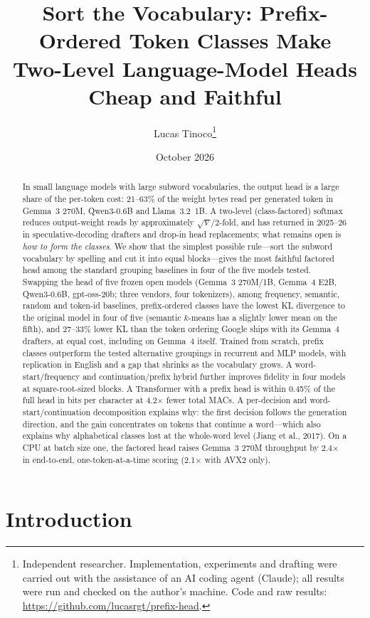 \documentclass[11pt]{article}
\title{Sort the Vocabulary: Prefix-Ordered Token Classes Make\\Two-Level Language-Model Heads Cheap and Faithful}
\author{Lucas Tinoco\thanks{Independent researcher. Implementation, experiments and drafting were carried out with the assistance of an AI coding agent (Claude); all results were run and checked on the author's machine. Code and raw results: \url{https://github.com/lucasrgt/prefix-head}.}}
\date{October 2026}
\begin{document}
\maketitle

\begin{abstract}
In small language models with large subword vocabularies, the output head is a large share of the per-token cost: 21--63\% of the weight bytes read per generated token in Gemma~3 270M, Qwen3-0.6B and Llama~3.2~1B. A two-level (class-factored) softmax reduces output-weight reads by approximately $\sqrt{V}/2$-fold, and has returned in 2025--26 in speculative-decoding drafters and drop-in head replacements; what remains open is \emph{how to form the classes}. We show that the simplest possible rule---sort the subword vocabulary by spelling and cut it into equal blocks---gives the most faithful factored head among the standard grouping baselines in four of the five models tested. Swapping the head of five frozen open models (Gemma~3 270M/1B, Gemma~4 E2B, Qwen3-0.6B, gpt-oss-20b; three vendors, four tokenizers), among frequency, semantic, random and token-id baselines, prefix-ordered classes have the lowest KL divergence to the original model in four of five (semantic $k$-means has a slightly lower mean on the fifth), and 27--33\% lower KL than the token ordering Google ships with its Gemma~4 drafters, at equal cost, including on Gemma~4 itself. Trained from scratch, prefix classes outperform the tested alternative groupings in recurrent and MLP models, with replication in English and a gap that shrinks as the vocabulary grows. A word-start/frequency and continuation/prefix hybrid further improves fidelity in four models at square-root-sized blocks. A Transformer with a prefix head is within 0.45\% of the full head in bits per character at 4.2$\times$ fewer total MACs. A per-decision and word-start/continuation decomposition explains why: the first decision follows the generation direction, and the gain concentrates on tokens that continue a word---which also explains why alphabetical classes lost at the whole-word level (Jiang et al., 2017). On a CPU at batch size one, the factored head raises Gemma~3 270M throughput by 2.4$\times$ in end-to-end, one-token-at-a-time scoring (2.1$\times$ with AVX2 only).
\end{abstract}

\section{Introduction}
\end{document}
